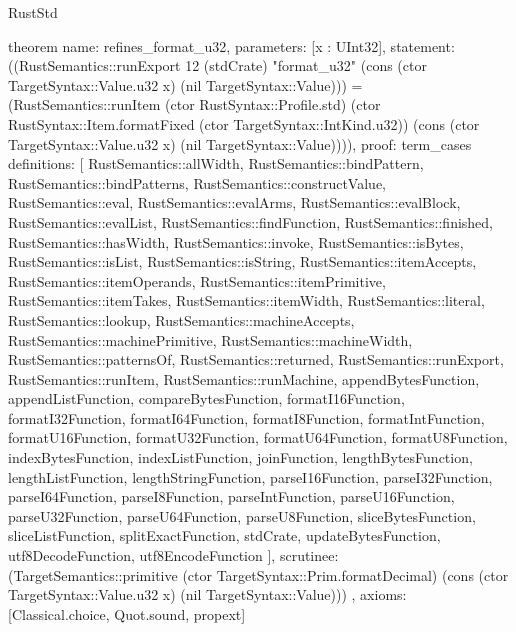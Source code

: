 \begin{lexlean}{RustStd}
\begin{semanticmodule}
theorem{
  name: refines_format_u32,
  parameters: [x : UInt32],
  statement: ((RustSemantics::runExport 12 (stdCrate) "format_u32" (cons (ctor TargetSyntax::Value.u32 x) (nil TargetSyntax::Value))) = (RustSemantics::runItem (ctor RustSyntax::Profile.std) (ctor RustSyntax::Item.formatFixed (ctor TargetSyntax::IntKind.u32)) (cons (ctor TargetSyntax::Value.u32 x) (nil TargetSyntax::Value)))),
  proof: term_cases{
    definitions: [
      RustSemantics::allWidth,
      RustSemantics::bindPattern,
      RustSemantics::bindPatterns,
      RustSemantics::constructValue,
      RustSemantics::eval,
      RustSemantics::evalArms,
      RustSemantics::evalBlock,
      RustSemantics::evalList,
      RustSemantics::findFunction,
      RustSemantics::finished,
      RustSemantics::hasWidth,
      RustSemantics::invoke,
      RustSemantics::isBytes,
      RustSemantics::isList,
      RustSemantics::isString,
      RustSemantics::itemAccepts,
      RustSemantics::itemOperands,
      RustSemantics::itemPrimitive,
      RustSemantics::itemTakes,
      RustSemantics::itemWidth,
      RustSemantics::literal,
      RustSemantics::lookup,
      RustSemantics::machineAccepts,
      RustSemantics::machinePrimitive,
      RustSemantics::machineWidth,
      RustSemantics::patternsOf,
      RustSemantics::returned,
      RustSemantics::runExport,
      RustSemantics::runItem,
      RustSemantics::runMachine,
      appendBytesFunction,
      appendListFunction,
      compareBytesFunction,
      formatI16Function,
      formatI32Function,
      formatI64Function,
      formatI8Function,
      formatIntFunction,
      formatU16Function,
      formatU32Function,
      formatU64Function,
      formatU8Function,
      indexBytesFunction,
      indexListFunction,
      joinFunction,
      lengthBytesFunction,
      lengthListFunction,
      lengthStringFunction,
      parseI16Function,
      parseI32Function,
      parseI64Function,
      parseI8Function,
      parseIntFunction,
      parseU16Function,
      parseU32Function,
      parseU64Function,
      parseU8Function,
      sliceBytesFunction,
      sliceListFunction,
      splitExactFunction,
      stdCrate,
      updateBytesFunction,
      utf8DecodeFunction,
      utf8EncodeFunction
    ],
    scrutinee: (TargetSemantics::primitive (ctor TargetSyntax::Prim.formatDecimal) (cons (ctor TargetSyntax::Value.u32 x) (nil TargetSyntax::Value)))
  },
  axioms: [Classical.choice, Quot.sound, propext]
}


\end{semanticmodule}
\end{lexlean}
